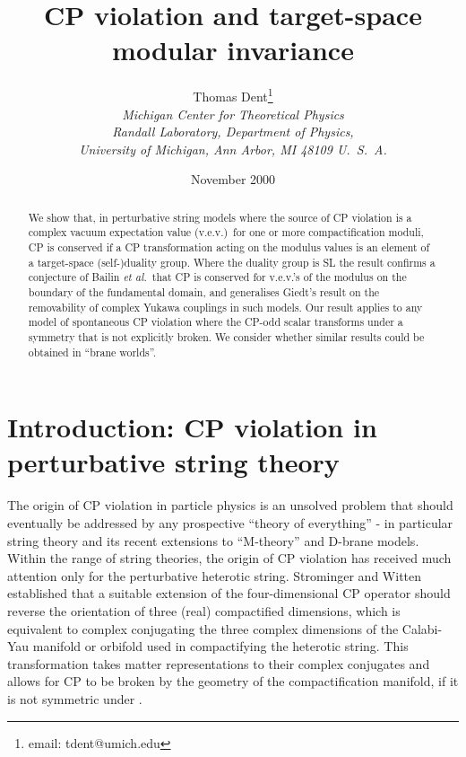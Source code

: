 \documentclass[a4paper,12pt]{article}
\title{\preprintno{{\bf MCTP-00-07}}
CP violation and target-space modular invariance}
\author{Thomas Dent\thanks{email: tdent@umich.edu} \\
	{\em Michigan Center for Theoretical Physics} \\
        {\em Randall Laboratory, Department of Physics,} \\
        {\em University of Michigan, Ann Arbor, MI 48109 U.\ S.\ A.}}
\date{November 2000}
\begin{document}
\maketitle

\begin{abstract}
We show that, in perturbative string models where the source of CP violation is a complex vacuum expectation value (v.e.v.)\ for one or more compactification moduli, CP is conserved if a CP transformation acting on the modulus values is an element of a target-space \mbox{(self-)duality} group. Where the duality group is SL\coordHE{} the result confirms a conjecture of Bailin {\em et al.\/}\ that CP is conserved for v.e.v.'s of the \coordHE{} modulus on the boundary of the fundamental domain, and generalises Giedt's result on the removability of complex Yukawa couplings in such models. Our result applies to any model of spontaneous CP violation where the CP-odd scalar transforms under a symmetry that is not explicitly broken. We consider whether similar results could be obtained in ``brane worlds''.
\end{abstract}

\section{Introduction: CP violation in perturbative string theory} 
The origin of CP violation in particle physics is an unsolved problem that should eventually be addressed by any prospective ``theory of everything'' - in particular string theory and its recent extensions to ``M-theory'' and D-brane models. Within the range of string theories, the origin of CP violation has received much attention only for the perturbative heterotic string. Strominger and Witten \cite{StroWitten85} established that a suitable extension of the four-dimensional CP operator should reverse the orientation of three (real) compactified dimensions, which is equivalent to complex conjugating the three complex dimensions \coordHE{} of the Calabi-Yau manifold or orbifold used in compactifying the heterotic string. This transformation takes matter representations \coordHE{} to their complex conjugates \coordHE{} and allows for CP to be broken by the geometry of the compactification manifold, if it is not symmetric under \coordHE{}. 
\end{document}

